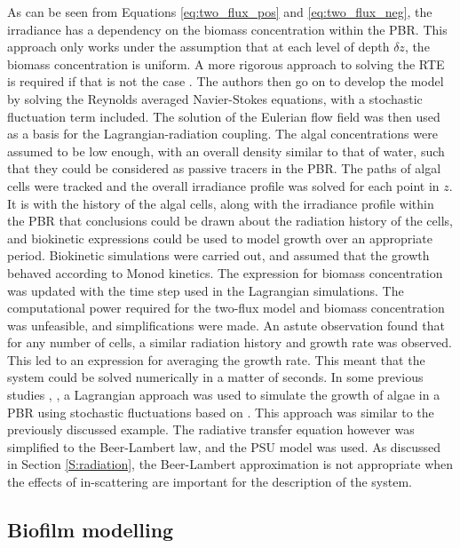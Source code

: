 As can be seen from Equations \ref{eq:two_flux_pos} and \ref{eq:two_flux_neg}, the irradiance has a dependency on the biomass concentration within the PBR. This approach only works under the assumption that at each level of depth $\delta z$, the biomass concentration is uniform. A more rigorous approach to solving the RTE is required if that is not the case \cite{pruvost2008}. The authors then go on to develop the model by solving the Reynolds averaged Navier-Stokes equations, with a stochastic fluctuation term included. The solution of the Eulerian flow field was then used as a basis for the Lagrangian-radiation coupling. The algal concentrations were assumed to be low enough, with an overall density similar to that of water, such that they could be considered as passive tracers in the PBR. The paths of algal cells were tracked and the overall irradiance profile was solved for each point in $z$. It is with the history of the algal cells, along with the irradiance profile within the PBR that conclusions could be drawn about the radiation history of the cells, and biokinetic expressions could be used to model growth over an appropriate period. Biokinetic simulations were carried out, and assumed that the growth behaved according to Monod kinetics. The expression for biomass concentration was updated with the time step used in the Lagrangian simulations. The computational power required for the two-flux model and biomass concentration was unfeasible, and simplifications were made. An astute observation found that for any number of cells, a similar radiation history and growth rate was observed. This led to an expression for averaging the growth rate. This meant that the system could be solved numerically in a matter of seconds. In some previous studies \cite{marshall2011}, \cite{marschall2012}, a Lagrangian approach was used to simulate the growth of algae in a PBR using stochastic fluctuations based on \cite{thomson1987}. This approach was similar to the previously discussed example. The radiative transfer equation however was simplified to the Beer-Lambert law, and the PSU model \cite{eilers1988} was used. As discussed in Section \ref{S:radiation}, the Beer-Lambert approximation is not appropriate when the effects of in-scattering are important for the description of the system. 



\subsection{Biofilm modelling}
\label{sec:Intro-biofilm}
